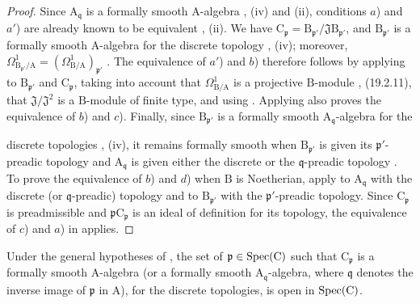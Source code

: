 \begin{proof}
Since $\mathrm{A}_{\mathfrak{q}}$ is a formally smooth
$\mathrm{A}$-algebra , (iv) and (ii), conditions $a$) and
$a'$) are already known to be equivalent , (ii). We have
$\mathrm{C}_\mathfrak{p}=\mathrm{B}_{\mathfrak{p}'}/
\mathfrak{J}\mathrm{B}_{\mathfrak{p}'}$, and
$\mathrm{B}_{\mathfrak{p}'}$ is a formally smooth $\mathrm{A}$-algebra for
the discrete topology , (iv); moreover,
$\Omega^1_{\mathrm{B}_{\mathfrak{p}'}/\mathrm{A}}
=(\Omega^1_{\mathrm{B}/\mathrm{A}})_{\mathfrak{p}'}$ .
The equivalence of $a'$) and $b$) therefore follows by applying
 to $\mathrm{B}_{\mathfrak{p}'}$ and
$\mathrm{C}_\mathfrak{p}$, taking into account that
$\Omega^1_{\mathrm{B}/\mathrm{A}}$ is a projective $\mathrm{B}$-module
, (19.2.11), that
$\mathfrak{J}/\mathfrak{J}^2$ is a $\mathrm{B}$-module of finite type, and
using . Applying  also proves the equivalence
of $b$) and $c$). Finally, since $\mathrm{B}_{\mathfrak{p}'}$ is a formally
smooth $\mathrm{A}_{\mathfrak{q}}$-algebra for the


discrete topologies , (iv), it remains formally smooth when
$\mathrm{B}_{\mathfrak{p}'}$ is given its $\mathfrak{p}'$-preadic topology
and $\mathrm{A}_{\mathfrak{q}}$ is given either the discrete or the
$\mathfrak{q}$-preadic topology . To prove the equivalence of
$b$) and $d$) when $\mathrm{B}$ is Noetherian, apply  to
$\mathrm{A}_{\mathfrak{q}}$ with the discrete (or $\mathfrak{q}$-preadic)
topology and to $\mathrm{B}_{\mathfrak{p}'}$ with the
$\mathfrak{p}'$-preadic topology. Since $\mathrm{C}_\mathfrak{p}$ is
preadmissible and $\mathfrak{p}\mathrm{C}_\mathfrak{p}$ is an ideal of
definition for its topology, the equivalence of $c$) and $a$) in
 applies.
\end{proof}

\begin{corollary}[22.6.5]
\label{0.22.6.5}
Under the general hypotheses of , the set of
$\mathfrak{p}\in\operatorname{Spec}(\mathrm{C})$ such that $\mathrm{C}_\mathfrak{p}$ is a
formally smooth $\mathrm{A}$-algebra (or a formally smooth
$\mathrm{A}_{\mathfrak{q}}$-algebra, where $\mathfrak{q}$ denotes the inverse
image of $\mathfrak{p}$ in $\mathrm{A}$), for the discrete topologies, is open
in $\operatorname{Spec}(\mathrm{C})$.
\end{corollary}

